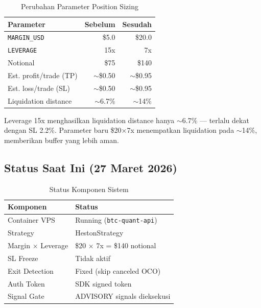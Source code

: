 \documentclass[10pt,a4paper]{article}
\begin{document}
\begin{table}[ht]
\caption{Perubahan Parameter Position Sizing}
\label{tab:sizing}
\centering
\small
\begin{tabular}{lrr}
\toprule
\textbf{Parameter} & \textbf{Sebelum} & \textbf{Sesudah} \\
\midrule
\texttt{MARGIN\_USD}        & \$5.0  & \$20.0 \\
\texttt{LEVERAGE}           & 15x    & 7x     \\
Notional                    & \$75   & \$140  \\
Est. profit/trade (TP)      & $\sim$\$0.50 & $\sim$\$0.95 \\
Est. loss/trade (SL)        & $\sim$\$0.50 & $\sim$\$0.95 \\
Liquidation distance        & $\sim$6.7\%  & $\sim$14\%   \\
\bottomrule
\end{tabular}
\end{table}

Leverage 15x menghasilkan liquidation distance hanya $\sim$6.7\% — terlalu dekat
dengan SL 2.2\%. Parameter baru \$20$\times$7x menempatkan liquidation pada
$\sim$14\%, memberikan buffer yang lebih aman.

\subsection{Status Saat Ini (27 Maret 2026)}
\label{subsec:status}

\begin{table}[ht]
\caption{Status Komponen Sistem}
\label{tab:status}
\centering
\small
\begin{tabular}{ll}
\toprule
\textbf{Komponen} & \textbf{Status} \\
\midrule
Container VPS         & Running (\texttt{btc-quant-api}) \\
Strategy              & HestonStrategy \\
Margin $\times$ Leverage & \$20 $\times$ 7x = \$140 notional \\
SL Freeze             & Tidak aktif \\
Exit Detection        & Fixed (skip canceled OCO) \\
Auth Token            & SDK signed token \\
Signal Gate           & ADVISORY signals dieksekusi \\
\bottomrule
\end{tabular}
\end{table}
\end{document}
